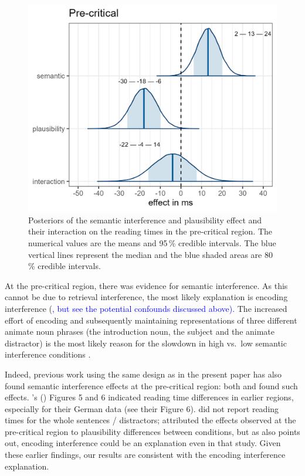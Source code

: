 \documentclass[a4paper, man, floatsintext]{apa7}
\begin{document}
{\begin{figure}
    \centering
        \caption{Posteriors of the semantic interference and plausibility effect and their interaction on the reading times in the pre-critical region. The numerical values are the means and 95\,\% credible intervals. The blue vertical lines represent the median and the blue shaded areas are 80\,\% credible intervals.}\label{fig:posteriors_plausibility}
    \includegraphics[width=0.8\linewidth]{images/posteriors_spr_pooled_774_plausibility.png}
\end{figure}
}

At the pre-critical region, there was evidence for semantic interference. As this cannot be due to retrieval interference, the most likely explanation is encoding interference (\cite{Oberauer_Kliegl_2006}\textcolor{blue}{, but see the potential confounds discussed above).} The increased effort of encoding and subsequently maintaining representations of three different animate noun phrases (the introduction noun, the subject and the animate distractor) is the most likely reason for the slowdown in high vs.\ low semantic interference conditions \citep[for similar findings, see e.g., ][]{lago_etal_2021, ness2019, ness2017, kush_etal_2015, gordon02}. 

Indeed, previous work using the same design as in the present paper has also found semantic interference effects at the pre-critical region: both \textcite{vandyke07} and \textcite{mertzen} found such effects. \citeauthor{mertzen}'s (\citeyear{mertzen}) Figures 5 and 6 indicated reading time differences in earlier regions, especially for their German data (see their Figure 6). \textcite{vandyke07} did not report reading times for the whole sentences / distractors;  \citeauthor{vandyke07} attributed the effects observed at the pre-critical region to plausibility differences between conditions, but as \textcite{mertzen} also points out, encoding interference could be an explanation even in that study. Given these earlier findings, our results are consistent with the encoding interference explanation.
\end{document}
